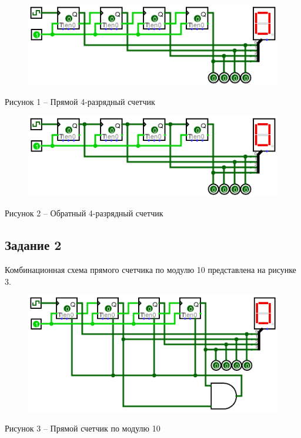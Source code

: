 \documentclass[a4paper,14pt]{extarticle}
\begin{document}
	\begin{figure}[h]
		\centering
		\includegraphics[width=0.8\linewidth]{images/s-1-1}
	\end{figure}
	\begin{center}
		Рисунок 1 – Прямой 4-разрядный счетчик
	\end{center}
	
	\begin{figure}[h]
		\centering
		\includegraphics[width=0.8\linewidth]{images/s-1-2}
	\end{figure}
	\begin{center}
		Рисунок 2 – Обратный 4-разрядный счетчик
	\end{center}
	
	\pagebreak
	\subsection*{Задание 2}
	Комбинационная схема прямого счетчика по модулю 10 представлена на рисунке 3.
	
	\begin{figure}[h]
		\centering
		\includegraphics[width=0.8\linewidth]{images/s-2}
	\end{figure}
	\begin{center}
		Рисунок 3 – Прямой счетчик по модулю 10
	\end{center}
	
\end{document}
